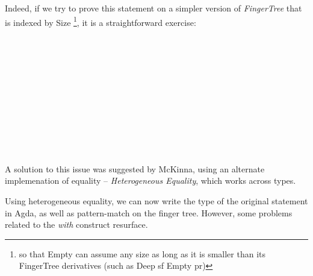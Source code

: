 \documentclass[12pt,twoside,notitlepage]{report}
\begin{document}
Indeed, if we try to prove this statement on a simpler version of \textit{FingerTree} that is indexed by Size \footnote{so that Empty can assume any size as long as it is smaller than its FingerTree derivatives (such as Deep sf Empty pr)}, it is a straightforward exercise: 

\begin{code}
\\
\> \AgdaSymbol{:}  \AgdaSymbol{\{}\AgdaSymbol{\}\{} \AgdaSymbol{:}  \AgdaSymbol{\}} \AgdaSymbol{\{} \AgdaSymbol{:}   \AgdaSymbol{\}}\<%
\\
\>[2]\<[14]%
\>[14]  \AgdaSymbol{:}   \<%
\\
\>[2]\<[14]%
\>[14]  \AgdaSymbol{:}    \<%
\\
\>[2]\<[14]%
\>[14] \AgdaSymbol{(} \AgdaSymbol{:}   \AgdaSymbol{)}\<%
\\
\>[2]\<[14]%
\>[14] \AgdaSymbol{(}   \AgdaSymbol{)}\<%
\\
\>[2]\<[14]%
\>[14] \AgdaSymbol{(}  \AgdaSymbol{)}\<%
\\
\>   \AgdaSymbol{=} \<%
\\
\> \AgdaSymbol{(} \AgdaSymbol{)} \AgdaSymbol{()}\<%
\\
\> \AgdaSymbol{(}    \AgdaSymbol{)} \AgdaSymbol{()}\<%
\\
\end{code}

A solution to this issue was suggested by McKinna\cite{heterogeneous_equality}, using an alternate implemenation of equality -- \textit{Heterogeneous Equality}, which works across types. 

Using heterogeneous equality, we can now write the type of the original statement in Agda, as well as pattern-match on the finger tree. However, some problems related to the \textit{with} construct resurface.
\end{document}
